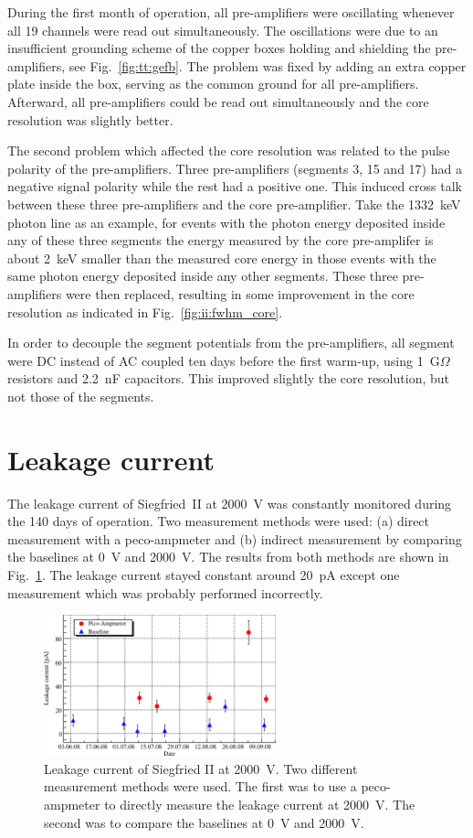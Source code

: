 During the first month of operation, all pre-amplifiers were oscillating whenever all 19 channels were read out simultaneously. The oscillations were due to an insufficient grounding scheme of the copper boxes holding and shielding the pre-amplifiers, see Fig.~\ref{fig:tt:gefb}. The problem was fixed by adding an extra copper plate inside the box, serving as the common ground for all pre-amplifiers. Afterward, all pre-amplifiers could be read out simultaneously and the core resolution was slightly better.

The second problem which affected the core resolution was related to the pulse polarity of the pre-amplifiers. Three pre-amplifiers (segments 3, 15 and 17) had a negative signal polarity while the rest had a positive one. This induced cross talk between these three pre-amplifiers and the core pre-amplifier. Take the 1332~keV photon line as an example, for events with the photon energy deposited inside any of these three segments the energy measured by the core pre-amplifer is about 2~keV smaller than the measured core energy in those events with the same photon energy deposited inside any other segments. These three pre-amplifiers were then replaced, resulting in some improvement in the core resolution as indicated in Fig.~\ref{fig:ii:fwhm_core}.

In order to decouple the segment potentials from the pre-amplifiers, all segment were DC instead of AC coupled ten days before the first warm-up, using 1~G$\Omega$ resistors and 2.2~nF capacitors. This improved slightly the core resolution, but not those of the segments.


\section{Leakage current}
\label{sec:ii:current}
The leakage current of Siegfried~II at 2000~V was constantly monitored during the 140 days of operation. Two measurement methods were used: (a) direct measurement with a peco-ampmeter and (b) indirect measurement by comparing the baselines at 0~V and 2000~V. The results from both methods are shown in Fig.~\ref{fig:ii:lc}. The leakage current stayed constant around 20~pA except one measurement which was probably performed incorrectly.

\begin{figure}[htbp]
\centering
\includegraphics[width=0.6\textwidth, clip]{LC}
\caption{Leakage current of Siegfried II at 2000~V. Two different measurement methods were used. The first was to use a peco-ampmeter to directly measure the leakage current at 2000~V. The second was to compare the baselines at 0~V and 2000~V.}
\label{fig:ii:lc}
\end{figure}

